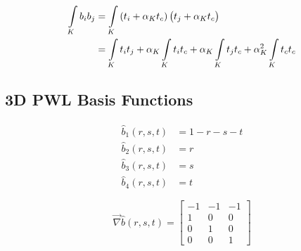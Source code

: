 \begin{equation}
\label{eq::App_BF_2D_triref_massterm}
\begin{aligned}
\int\displaylimits_K b_i b_j &= \int\displaylimits_K \left( t_i + \alpha_K t_c  \right) \left(  t_j + \alpha_K t_c \right) \\
&= \int\displaylimits_K t_i t_j + \alpha_K \int\displaylimits_K t_i t_c + \alpha_K \int\displaylimits_K t_j t_c + \alpha_K^2 \int\displaylimits_K t_c t_c
\end{aligned}
\end{equation}

\subsection{3D PWL Basis Functions}
\label{sec::appendix_BF_PWLInt_3D}



\begin{equation}
\label{eq::3D_tetref_BF}
\begin{aligned}
	\hat{b}_1(r,s,t) & = 1-r-s-t \\
	\hat{b}_2(r,s,t) & = r \\
	\hat{b}_3(r,s,t) & = s \\
	\hat{b}_4(r,s,t) & = t
\end{aligned}
\end{equation}

\begin{equation}
\label{eq::App_BF_3D_tetref_grad}
\vec{\nabla} \hat{b} (r,s,t)  = 
\left[
\begin{array}{ccc}
-1 & -1 & -1 \\
1 & 0 & 0 \\
0 & 1 & 0 \\
0 & 0 & 1
\end{array}
\right]
\end{equation}
